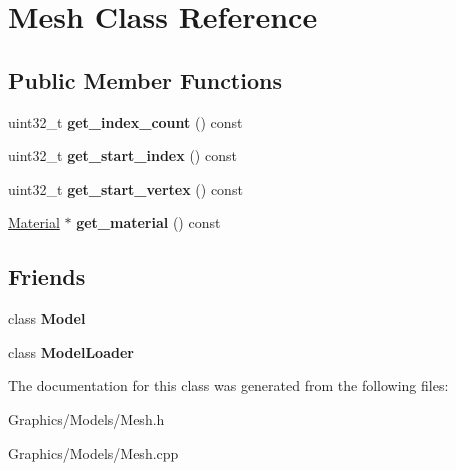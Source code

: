 \hypertarget{classMesh}{}\section{Mesh Class Reference}
\label{classMesh}
\subsection*{Public Member Functions}
\begin{DoxyCompactItemize}
\item 
\mbox{\label{classMesh_a2728b2c9d70d9b7cb5df407bad0b1057}} 
uint32\+\_\+t {\bfseries get\+\_\+index\+\_\+count} () const
\item 
\mbox{\label{classMesh_ac6ff36aa0676d9cae667631056e868b3}} 
uint32\+\_\+t {\bfseries get\+\_\+start\+\_\+index} () const
\item 
\mbox{\label{classMesh_a203b83303bf3419d2c82a8078a876bee}} 
uint32\+\_\+t {\bfseries get\+\_\+start\+\_\+vertex} () const
\item 
\mbox{\label{classMesh_aef61adb0e64d3124731090da8f43977f}} 
\hyperlink{classMaterial}{Material} $\ast$ {\bfseries get\+\_\+material} () const
\end{DoxyCompactItemize}
\subsection*{Friends}
\begin{DoxyCompactItemize}
\item 
\mbox{\label{classMesh_a2bf2a0e9b454c55aa5dcb5aa4698697b}} 
class {\bfseries Model}
\item 
\mbox{\label{classMesh_ac22dade55c1e8f81ea3e0892cd321190}} 
class {\bfseries Model\+Loader}
\end{DoxyCompactItemize}


The documentation for this class was generated from the following files\+:\begin{DoxyCompactItemize}
\item 
Graphics/\+Models/Mesh.\+h\item 
Graphics/\+Models/Mesh.\+cpp\end{DoxyCompactItemize}

